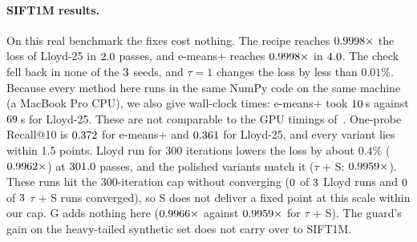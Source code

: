 \paragraph{SIFT1M results.} On this real benchmark the fixes cost nothing. The recipe reaches
$0.9998\times$ the loss of Lloyd-25 in $2.0$ passes, and e-means+ reaches
$0.9998\times$ in $4.0$. The check fell back in none of the $3$ seeds, and
$\tau=1$ changes the loss by less than $0.01\%$. Because every method here runs in the same NumPy
code on the same machine (a MacBook Pro CPU), we also give wall-clock times: e-means+
took $10$\,s against $69$\,s for Lloyd-25. These are not comparable to the
GPU timings of~\cite{bessa2026}. One-probe Recall@10 is $0.372$ for e-means+ and
$0.361$ for Lloyd-25, and every variant lies within 1.5 points. Lloyd run for 300
iterations lowers the loss by about $0.4\%$ ($0.9962\times$) at $301.0$
passes, and the polished variants match it ($\tau$ + S: $0.9959\times$). These runs
hit the 300-iteration cap without converging ($0$ of $3$ Lloyd runs and
$0$ of $3$ $\tau$ + S runs converged), so S does not deliver a fixed point at
this scale within our cap. G adds nothing here ($0.9966\times$ against $0.9959\times$
for $\tau$ + S). The guard's gain on the heavy-tailed synthetic set does not carry over to SIFT1M.
